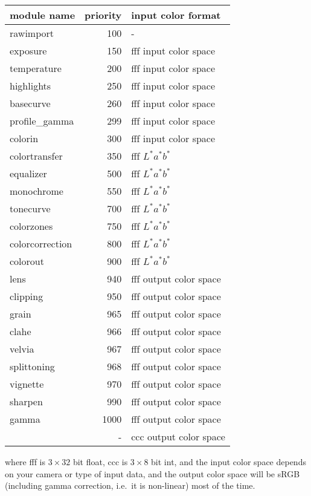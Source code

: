 \documentclass[a4paper,twoside]{scrartcl}
\begin{document}
\begin{tabular}{lrl}
module name & priority & input color format \\
\hline
rawimport      &  100  &  - \\ 
exposure       &  150  &  fff input color space \\
temperature    &  200  &  fff input color space \\
highlights     &  250  &  fff input color space \\
basecurve      &  260  &  fff input color space \\
profile\_gamma &  299  &  fff input color space \\
colorin        &  300  &  fff input color space \\
colortransfer  &  350  &  fff $L^*a^*b^*$ \\
equalizer      &  500  &  fff $L^*a^*b^*$ \\
monochrome     &  550  &  fff $L^*a^*b^*$ \\
tonecurve      &  700  &  fff $L^*a^*b^*$ \\
colorzones     &  750  &  fff $L^*a^*b^*$ \\
colorcorrection&  800  &  fff $L^*a^*b^*$ \\
colorout       &  900  &  fff $L^*a^*b^*$ \\
lens           &  940  &  fff output color space \\
clipping       &  950  &  fff output color space \\
grain          &  965  &  fff output color space \\
clahe          &  966  &  fff output color space \\
velvia         &  967  &  fff output color space \\
splittoning    &  968  &  fff output color space \\
vignette       &  970  &  fff output color space \\
sharpen        &  990  &  fff output color space \\
gamma          & 1000  &  fff output color space \\
               &   -   &  ccc output color space \\
\end{tabular}

\medskip

where fff is $3\times32$ bit float, ccc is $3\times8$ bit int, and the input
color space depends on your camera or type of input data, and the output color space will
be sRGB (including gamma correction, i.e.\ it is non-linear) most of the time.
\end{document}
